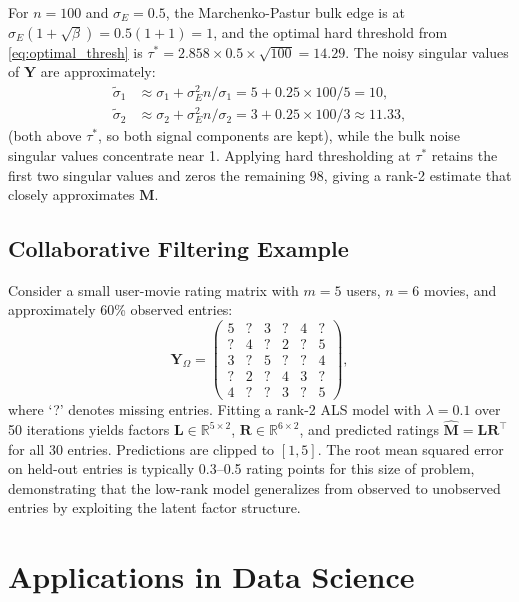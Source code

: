 \documentclass[conference]{IEEEtran}
\begin{document}
For $n = 100$ and $\sigma_E = 0.5$, the Marchenko-Pastur bulk edge is at $\sigma_E(1 + \sqrt{\beta}) = 0.5(1 + 1) = 1$, and the optimal hard threshold from \eqref{eq:optimal_thresh} is $\tau^* = 2.858 \times 0.5 \times \sqrt{100} = 14.29$. The noisy singular values of $\mathbf{Y}$ are approximately:
\begin{align}
  \tilde{\sigma}_1 &\approx \sigma_1 + \sigma_E^2 n / \sigma_1 = 5 + 0.25 \times 100/5 = 10, \\
  \tilde{\sigma}_2 &\approx \sigma_2 + \sigma_E^2 n / \sigma_2 = 3 + 0.25 \times 100/3 \approx 11.33,
\end{align}
(both above $\tau^*$, so both signal components are kept), while the bulk noise singular values concentrate near 1. Applying hard thresholding at $\tau^*$ retains the first two singular values and zeros the remaining 98, giving a rank-2 estimate that closely approximates $\mathbf{M}$.

\subsection{Collaborative Filtering Example}

Consider a small user-movie rating matrix with $m = 5$ users, $n = 6$ movies, and approximately 60\% observed entries:
\begin{equation}
  \mathbf{Y}_\Omega = \begin{pmatrix}
    5 & ? & 3 & ? & 4 & ? \\
    ? & 4 & ? & 2 & ? & 5 \\
    3 & ? & 5 & ? & ? & 4 \\
    ? & 2 & ? & 4 & 3 & ? \\
    4 & ? & ? & 3 & ? & 5
  \end{pmatrix},
\end{equation}
where `?' denotes missing entries. Fitting a rank-2 ALS model with $\lambda = 0.1$ over 50 iterations yields factors $\mathbf{L} \in \mathbb{R}^{5 \times 2}$, $\mathbf{R} \in \mathbb{R}^{6 \times 2}$, and predicted ratings $\hat{\mathbf{M}} = \mathbf{L}\mathbf{R}^\top$ for all 30 entries. Predictions are clipped to $[1,5]$. The root mean squared error on held-out entries is typically 0.3--0.5 rating points for this size of problem, demonstrating that the low-rank model generalizes from observed to unobserved entries by exploiting the latent factor structure.

\section{Applications in Data Science}
\label{sec:applications}
\end{document}
